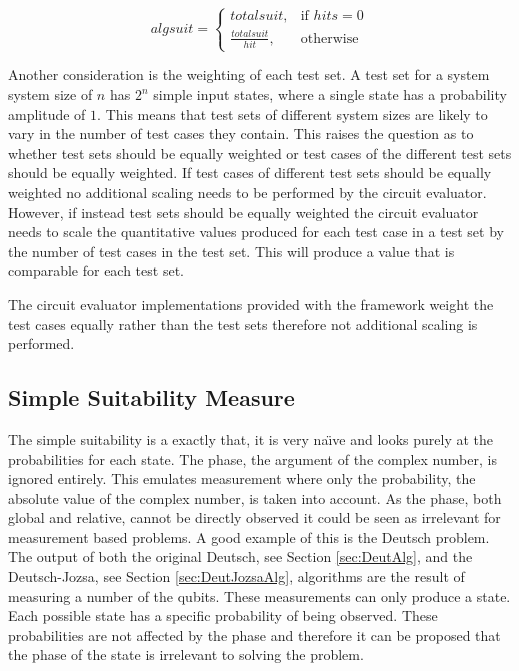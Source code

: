 \begin{equation}
 algsuit = 
\left\{
  \begin{array}{cc} totalsuit, & \mbox{if } hits={0}\\ 
  \frac{totalsuit}{hit}, & \mbox{otherwise}\end{array}
\right.
\label{eqn:cirevalhitsscaling}
\end{equation}

Another consideration is the weighting of each test set.
A test set for a system system size of $n$ has $2^n$ simple input states, where a single state has a probability amplitude of $1$.
This means that test sets of different system sizes are likely to vary in the number of test cases they contain.
This raises the question as to whether test sets should be equally weighted or test cases of the different test sets should be equally weighted.
If test cases of different test sets should be equally weighted no additional scaling needs to be performed by the circuit evaluator.
However, if instead test sets should be equally weighted the circuit evaluator needs to scale the quantitative values produced for each test case in a test set by the number of test cases in the test set.
This will produce a value that is comparable for each test set.

The circuit evaluator implementations provided with the framework weight the test cases equally rather than the test sets therefore not additional scaling is performed.

\subsection{Simple Suitability Measure}
\label{sec:simplsuitmeas}
The simple suitability is a exactly that, it is very na\"{\i}ve and looks purely at the probabilities for each state.
The phase, the argument of the complex number, is ignored entirely.
This emulates measurement where only the probability, the absolute value of the complex number, is taken into account.
As the phase, both global and relative, cannot be directly observed it could be seen as irrelevant for measurement based problems.
A good example of this is the Deutsch problem.
The output of both the original Deutsch, see Section \ref{sec:DeutAlg}, and the Deutsch-Jozsa, see Section \ref{sec:DeutJozsaAlg}, algorithms are the result of measuring a number of the qubits.
These measurements can only produce a state.
Each possible state has a specific probability of being observed.
These probabilities are not affected by the phase and therefore it can be proposed that the phase of the state is irrelevant to solving the problem.

